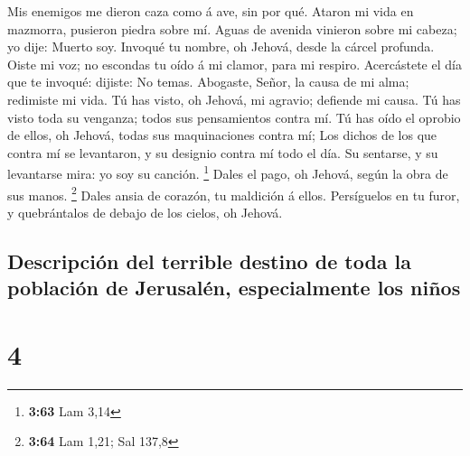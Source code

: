  Mis enemigos me dieron caza como á ave, sin por qué.
 Ataron mi vida en mazmorra, pusieron piedra sobre mí.
 Aguas de avenida vinieron sobre mi cabeza; yo dije: Muerto
soy.  Invoqué tu nombre, oh Jehová, desde la cárcel
profunda.  Oiste mi voz; no escondas tu oído á mi clamor,
para mi respiro.  Acercástete el día que te invoqué:
dijiste: No temas.  Abogaste, Señor, la causa de mi alma;
redimiste mi vida.  Tú has visto, oh Jehová, mi agravio;
defiende mi causa.  Tú has visto toda su venganza; todos
sus pensamientos contra mí.  Tú has oído el oprobio de
ellos, oh Jehová, todas sus maquinaciones contra mí;  Los
dichos de los que contra mí se levantaron, y su designio contra mí todo
el día.  Su sentarse, y su levantarse mira: yo soy su
canción. \footnote{\textbf{3:63} Lam 3,14}  Dales el pago,
oh Jehová, según la obra de sus manos. \footnote{\textbf{3:64} Lam 1,21;
  Sal 137,8}  Dales ansia de corazón, tu maldición á ellos.
 Persíguelos en tu furor, y quebrántalos de debajo de los
cielos, oh Jehová.

\hypertarget{descripciuxf3n-del-terrible-destino-de-toda-la-poblaciuxf3n-de-jerusaluxe9n-especialmente-los-niuxf1os}{%
\subsection{Descripción del terrible destino de toda la población de
Jerusalén, especialmente los
niños}\label{descripciuxf3n-del-terrible-destino-de-toda-la-poblaciuxf3n-de-jerusaluxe9n-especialmente-los-niuxf1os}}

\hypertarget{section-3}{%
\section{4}\label{section-3}}

